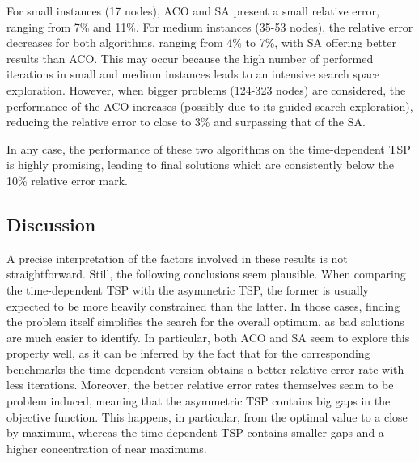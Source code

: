 For small instances (17 nodes), ACO and SA present a small relative error, ranging from 7\% and 11\%. For medium instances (35-53 nodes), the relative error decreases for both algorithms, ranging from 4\% to 7\%, with SA offering better results than ACO. This may occur because the high number of performed iterations in small and medium instances leads to an intensive search space exploration. However, when  bigger problems (124-323 nodes) are considered, the performance of the ACO increases (possibly due to its guided search exploration), reducing the relative error to close to 3\% and surpassing that of the SA. 

In any case, the performance of these two algorithms on the time-dependent TSP is highly promising, leading to final solutions which are consistently below the 10\% relative error mark. 


\subsection{Discussion}

A precise interpretation of the factors involved in these results is not straightforward. Still, the following conclusions seem plausible. When comparing the time-dependent TSP with the asymmetric TSP, the former is usually expected to be more heavily constrained than the latter. In those cases, finding the problem itself simplifies the search for the overall optimum, as bad solutions are much easier to identify. In particular, both ACO and SA seem to explore this property well, as it can be inferred by the fact that for the corresponding benchmarks the time dependent version obtains a better relative error rate with less iterations. Moreover, the better relative error rates themselves seam to be problem induced, meaning that the asymmetric TSP contains big gaps in the objective function. This happens, in particular, from the optimal value to a close by maximum, whereas the time-dependent TSP contains smaller gaps and a higher concentration of near maximums. 



